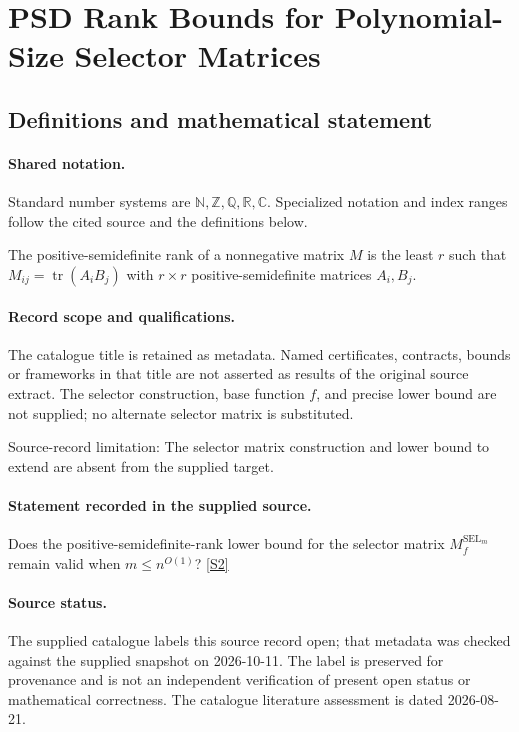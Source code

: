 \documentclass[11pt]{article}
\newcommand{\sref}[2]{\hyperlink{source:#1:#2}{[S#2]}}
\begin{document}
\section{PSD Rank Bounds for Polynomial-Size Selector Matrices}\label{statement}

\subsection{Definitions and mathematical statement}

\paragraph{Shared notation.}Standard number systems are $\mathbb N,\mathbb Z,\mathbb Q,\mathbb R,\mathbb C$. Specialized notation and index ranges follow the cited source and the definitions below.


The positive-semidefinite rank of a nonnegative matrix $M$ is the least $r$ such that $M_{ij}=\operatorname{tr}(A_iB_j)$ with $r\times r$ positive-semidefinite matrices $A_i,B_j$.
\paragraph{Record scope and qualifications.}
The catalogue title is retained as metadata. Named certificates, contracts, bounds or frameworks in that title are not asserted as results of the original source extract.
The selector construction, base function $f$, and precise lower bound are not supplied; no alternate selector matrix is substituted.

Source-record limitation: The selector matrix construction and lower bound to extend are absent from the supplied target.
\paragraph{Statement recorded in the supplied source.}
Does the positive-semidefinite-rank lower bound for the selector matrix $M_f^{\operatorname{SEL}_m}$ remain valid when $m\leq n^{O(1)}$? \sref{statement}{2}
\paragraph{Source status.}
The supplied catalogue labels this source record open; that metadata was checked against the supplied snapshot on 2026-10-11. The label is preserved for provenance and is not an independent verification of present open status or mathematical correctness. The catalogue literature assessment is dated 2026-08-21.
\end{document}
